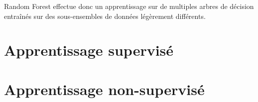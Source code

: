 Random Forest effectue donc un apprentissage sur de multiples arbres de décision entraînés sur des sous-ensembles de données légèrement différents.

 

\section{Apprentissage supervisé}



\section{Apprentissage non-supervisé}







